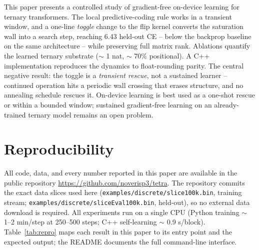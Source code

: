 \documentclass{article} %
\begin{document}
This paper presents a controlled study of gradient-free on-device learning for ternary transformers. The local predictive-coding rule works in a transient window, and a one-line \emph{toggle} change to the flip kernel converts the saturation wall into a search step, reaching 6.43 held-out CE -- below the backprop baseline on the same architecture -- while preserving full matrix rank. Ablations quantify the learned ternary substrate ($\sim$ 1 nat, $\sim$ 70\% positional). A C++ implementation reproduces the dynamics to float-rounding parity. The central negative result: the toggle is a \emph{transient rescue}, not a sustained learner -- continued operation hits a periodic wall crossing that erases structure, and no annealing schedule rescues it. On-device learning is best used as a one-shot rescue or within a bounded window; sustained gradient-free learning on an already-trained ternary model remains an open problem.




\appendix
\section{Reproducibility}
\label{app:reproduce}

All code, data, and every number reported in this paper are available in the public repository \url{https://github.com/noverisp3/tetra}. The repository commits the exact data slices used here (\texttt{examples/discrete/slice100k.bin}, training stream; \texttt{examples/discrete/sliceEval100k.bin}, held-out), so no external data download is required. All experiments run on a single CPU (Python training $\sim$ 1--2 min/step at 250--500 steps; C++ self-learning $\sim$ 0.9 s/block). Table~\ref{tab:repro} maps each result in this paper to its entry point and the expected output; the README documents the full command-line interface.
\end{document}

